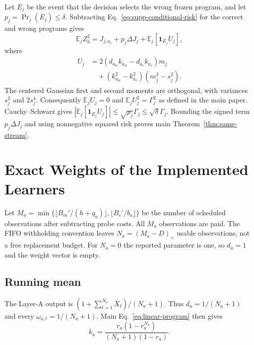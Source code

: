 \documentclass[journal]{IEEEtran}
\newcommand{\E}{\mathbb E}
\begin{document}
Let $E_j$ be the event that the decision selects the wrong frozen program, and let $p_j=\Pr_j(E_j)\le\delta$.
Subtracting Eq.~\eqref{eq:supp-conditional-risk} for the correct and wrong programs gives
\begin{equation}
\E_jZ_{\widehat a}^2=J_{j,a_c}+p_j\Delta J_j+\E_j[\mathbf1_{E_j}U_j],
\end{equation}
where
\begin{align}
U_j&=2(d_{a_w}k_{a_w}-d_{a_c}k_{a_c})m_j\nonumber\\
&\quad+(k_{a_w}^2-k_{a_c}^2)(m_j^2-s_j^2).
\end{align}
The centered Gaussian first and second moments are orthogonal, with variances $s_j^2$ and $2s_j^4$.
Consequently $\E_jU_j=0$ and $\E_jU_j^2=\Gamma_j^2$ as defined in the main paper.
Cauchy--Schwarz gives $|\E_j[\mathbf1_{E_j}U_j]|\le\sqrt{p_j}\Gamma_j\le\sqrt\delta\Gamma_j$.
Bounding the signed term $p_j\Delta J_j$ and using nonnegative squared risk proves main Theorem~\ref{thm:same-stream}.

\section{Exact Weights of the Implemented Learners}
Let $M_a=\min\{\lfloor B_m'/(h+q_a)\rfloor,\lfloor B_e'/b_a\rfloor\}$ be the number of scheduled observations after subtracting probe costs.
All $M_a$ observations are paid.
The FIFO withholding convention leaves $N_a=(M_a-D)_+$ usable observations, not a free replacement budget.
For $N_a=0$ the reported parameter is one, so $d_a=1$ and the weight vector is empty.

\subsection{Running mean}
The Layer-A output is $(1+\sum_{t=1}^{N_a}\bar X_t)/(N_a+1)$.
Thus $d_a=1/(N_a+1)$ and every $\omega_{a,t}=1/(N_a+1)$.
Main Eq.~\eqref{eq:linear-program} then gives
\begin{equation}
k_a=\frac{r_a(1-r_a^{N_a})}{(N_a+1)(1-r_a)}.
\end{equation}
\end{document}
